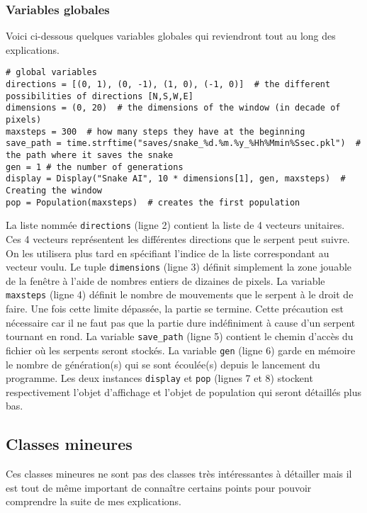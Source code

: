 \documentclass[12pt, a4paper, openany]{book}
\begin{document}
\subsubsection{Variables globales}
\label{r:2.7.1-var}
Voici ci-dessous quelques variables globales qui reviendront tout au long des explications.
\begin{verbatim}
# global variables
directions = [(0, 1), (0, -1), (1, 0), (-1, 0)]  # the different possibilities of directions [N,S,W,E]
dimensions = (0, 20)  # the dimensions of the window (in decade of pixels)
maxsteps = 300  # how many steps they have at the beginning
save_path = time.strftime("saves/snake_%d.%m.%y_%Hh%Mmin%Ssec.pkl")  # the path where it saves the snake
gen = 1 # the number of generations
display = Display("Snake AI", 10 * dimensions[1], gen, maxsteps)  # Creating the window
pop = Population(maxsteps)  # creates the first population
\end{verbatim}
La liste nommée \verb'directions' (ligne 2) contient la liste de 4 vecteurs unitaires. Ces 4 vecteurs représentent les différentes directions que le serpent peut suivre. On les utilisera plus tard en spécifiant l'indice de la liste correspondant au vecteur voulu. Le tuple \verb'dimensions' (ligne 3) définit simplement la zone jouable de la fenêtre à l'aide de nombres entiers de dizaines de pixels. La variable \verb'maxsteps' (ligne 4) définit le nombre de mouvements que le serpent à le droit de faire. Une fois cette limite dépassée, la partie se termine. Cette précaution est nécessaire car il ne faut pas que la partie dure indéfiniment à cause d'un serpent tournant en rond. La variable \verb'save_path' (ligne 5) contient le chemin d'accès du fichier où les serpents seront stockés. La variable \verb'gen' (ligne 6) garde en mémoire le nombre de génération(s) qui se sont écoulée(s) depuis le lancement du programme. Les deux instances \verb'display' et \verb'pop' (lignes 7 et 8) stockent respectivement l'objet d'affichage et l'objet de population qui seront détaillés plus bas.

\subsection{Classes mineures}
Ces classes mineures ne sont pas des classes très intéressantes à détailler mais il est tout de même important de connaître certains points pour pouvoir comprendre la suite de mes explications.
\end{document}
